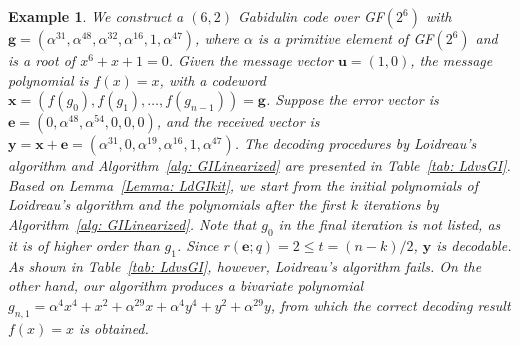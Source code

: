 \documentclass[11pt,onecolumn,draftcls]{IEEEtran}
\newtheorem{example}{Example}
\begin{document}
\begin{example} \label{example: 2szeros}
We construct a $(6, 2)$ Gabidulin code over GF$(2^6)$ with $\mathbf{g} = ( \alpha^{31}, \alpha^{48}, \alpha^{32},\alpha^{16},1,\alpha^{47})$, where $\alpha$ is a primitive element of GF$(2^6)$ and is a root of $x^6 + x + 1 = 0$. Given the message vector $\mathbf{u} = (1, 0)$, the message polynomial is $f(x) = x$, with a codeword $\mathbf{x} = (f(g_0), f(g_1), \ldots, f(g_{n-1})) = \mathbf{g}$. Suppose the error vector is $\mathbf{e} = ( 0, \alpha^{48}, \alpha^{54}, 0, 0, 0 )$, and the received vector is $\mathbf{y} = \mathbf{x} + \mathbf{e} = \left(\alpha^{31},0, \alpha^{19}, \alpha^{16}, 1, \alpha^{47}\right)$. The decoding procedures by Loidreau's algorithm and Algorithm~\ref{alg: GILinearized} are presented in Table~\ref{tab: LdvsGI}. Based on Lemma~\ref{Lemma: LdGIkit}, we start from the initial polynomials of Loidreau's algorithm and the polynomials after the first $k$ iterations by Algorithm~\ref{alg: GILinearized}. Note that $g_0$ in the final iteration is not listed, as it is of higher order than $g_1$. Since $r(\mathbf{e}; q) = 2 \le t = (n - k)/2$, $\mathbf{y}$ is decodable. As shown in Table~\ref{tab: LdvsGI}, however, Loidreau's algorithm fails. On the other hand, our algorithm produces a bivariate polynomial $g_{n,1} = \alpha^4 x^4 + x^2 + \alpha^{29}x + \alpha^4 y^4 + y^2 + \alpha^{29}y$, from which the correct decoding result $f(x) = x$ is obtained.
\end{example}
\end{document}
